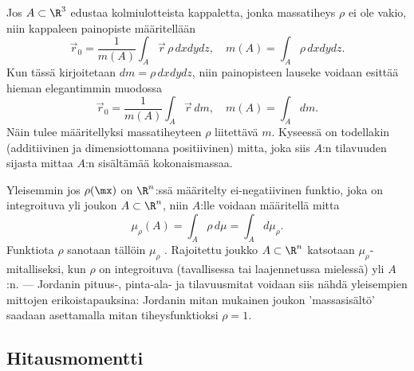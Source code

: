 Jos $A \subset \R^3$ edustaa kolmiulotteista kappaletta, jonka massatiheys $\rho$ ei ole vakio,
niin kappaleen painopiste määritellään
\[
\vec r_0=\frac{1}{m(A)}\int_A \vec r\,\rho\,dxdydz, \quad m(A) = \int_A \rho\,dxdydz.
\]
Kun tässä kirjoitetaan $dm=\rho\,dxdydz$, niin painopisteen lauseke voidaan esittää hieman
elegantimmin muodossa
\[
\vec r_0=\frac{1}{m(A)}\int_A \vec r\,dm, \quad m(A)=\int_A dm.
\]
Näin tulee määritellyksi massatiheyteen $\rho$ liitettävä  $m$. Kyseessä on 
todellakin (additiivinen ja dimensiottomana positiivinen) mitta, joka siis $A$:n tilavuuden
sijasta mittaa $A$:n sisältämää kokonaismassaa. 

Yleisemmin jos $\rho(\mx)$ on $\R^n$:ssä määritelty ei-negatiivinen funktio, joka on 
integroituva yli joukon $A \subset \R^n$, niin $A$:lle voidaan  määritellä mitta
\[ 
\mu_\rho(A) = \int_A \rho\,d\mu = \int_A d\mu_\rho. 
\]
%
Funktiota $\rho$ sanotaan tällöin  $\mu_\rho$ . Rajoitettu
joukko $A \subset \R^n$ katsotaan $\mu_\rho$-mitalliseksi, kun $\rho$ on integroituva 
(tavallisessa tai laajennetussa mielessä) yli $A$:n. --- Jordanin pituus-, pinta-ala- ja
tilavuusmitat voidaan siis nähdä yleisempien mittojen erikoistapauksina: Jordanin mitan 
mukainen joukon 'massasisältö' saadaan asettamalla mitan tiheysfunktioksi $\rho=1$.

\subsection{Hitausmomentti} 

